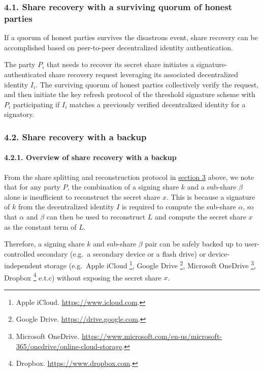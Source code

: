 \documentclass[
]{article}
\begin{document}
\hypertarget{share-recovery-quorum}{%
\subsubsection{4.1. Share recovery with a surviving quorum of honest
parties}\label{share-recovery-quorum}}

If a quorum of honest parties survives the disastrous event, share
recovery can be accomplished based on peer-to-peer decentralized
identity authentication.

The party \(P_i\) that needs to recover its secret share initiates a
signature-authenticated share recovery request leveraging its associated
decentralized identity \(I_i\). The surviving quorum of honest parties
collectively verify the request, and then initiate the key refresh
protocol of the threshold signature scheme with \(P_i\) participating if
\(I_i\) matches a previously verified decentralized identity for a
signatory.

\hypertarget{share-recovery-backup}{%
\subsubsection{4.2. Share recovery with a
backup}\label{share-recovery-backup}}

\hypertarget{share-recovery-backup-overview}{%
\paragraph{4.2.1. Overview of share recovery with a
backup}\label{share-recovery-backup-overview}}

From the share splitting and reconstruction protocol in
\protect\hyperlink{share-splitting-and-reconstruction}{section 3} above,
we note that for any party \(P\), the combination of a signing share
\(k\) and a sub-share \(\beta\) alone is insufficient to reconstruct the
secret share \(x\). This is because a signature of \(k\) from the
decentralized identity \(I\) is required to compute the sub-share
\(\alpha\), so that \(\alpha\) and \(\beta\) can then be used to
reconstruct \(L\) and compute the secret share \(x\) as the constant
term of \(L\).

Therefore, a signing share \(k\) and sub-share \(\beta\) pair can be
safely backed up to user-controlled secondary (e.g.~a secondary device
or a flash drive) or device-independent storage (e.g.~Apple iCloud
\footnote{Apple iCloud. \url{https://www.icloud.com}.}, Google Drive
\footnote{Google Drive. \url{https://drive.google.com}.}, Microsoft
OneDrive \footnote{Microsoft OneDrive.
  \url{https://www.microsoft.com/en-us/microsoft-365/onedrive/online-cloud-storage}.},
Dropbox \footnote{Dropbox. \url{https://www.dropbox.com}.} e.t.c)
without exposing the secret share \(x\).
\end{document}

